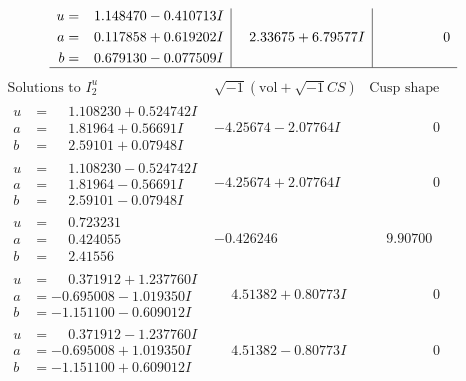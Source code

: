 \documentclass[1p]{elsarticle_modified}
\theoremstyle{definition}
\newcommand{\I}{\sqrt{-1}}
\begin{document}
$$\begin{array}{c|c|c}
\begin{aligned}
u &= \phantom{-}1.148470 - 0.410713 I \\
a &= \phantom{-}0.117858 + 0.619202 I \\
b &= \phantom{-}0.679130 - 0.077509 I\end{aligned}
 & \phantom{-}2.33675 + 6.79577 I & \phantom{-0.000000 } 0\\
 \hline 
 \end{array}$$\newpage$$\begin{array}{c|c|c}  
\text{Solutions to }I^u_{2}& \I (\text{vol} + \sqrt{-1}CS) & \text{Cusp shape}\\
 \hline 
\begin{aligned}
u &= \phantom{-}1.108230 + 0.524742 I \\
a &= \phantom{-}1.81964 + 0.56691 I \\
b &= \phantom{-}2.59101 + 0.07948 I\end{aligned}
 & -4.25674 - 2.07764 I & \phantom{-0.000000 } 0 \\ \hline\begin{aligned}
u &= \phantom{-}1.108230 - 0.524742 I \\
a &= \phantom{-}1.81964 - 0.56691 I \\
b &= \phantom{-}2.59101 - 0.07948 I\end{aligned}
 & -4.25674 + 2.07764 I & \phantom{-0.000000 } 0 \\ \hline\begin{aligned}
u &= \phantom{-}0.723231\phantom{ +0.000000I} \\
a &= \phantom{-}0.424055\phantom{ +0.000000I} \\
b &= \phantom{-}2.41556\phantom{ +0.000000I}\end{aligned}
 & -0.426246\phantom{ +0.000000I} & \phantom{-}9.90700\phantom{ +0.000000I} \\ \hline\begin{aligned}
u &= \phantom{-}0.371912 + 1.237760 I \\
a &= -0.695008 - 1.019350 I \\
b &= -1.151100 - 0.609012 I\end{aligned}
 & \phantom{-}4.51382 + 0.80773 I & \phantom{-0.000000 } 0 \\ \hline\begin{aligned}
u &= \phantom{-}0.371912 - 1.237760 I \\
a &= -0.695008 + 1.019350 I \\
b &= -1.151100 + 0.609012 I\end{aligned}
 & \phantom{-}4.51382 - 0.80773 I & \phantom{-0.000000 } 0 \\ \hline\begin{aligned}

\end{aligned}
\end{array}$$
\end{document}
